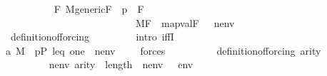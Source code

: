 \begin{isabellebody}
\ \ \ \ \ \ \isamarkupfalse%
\ {\isachardoublequoteopen}\ {\isachardot}{\kern0pt}{\isachardot}{\kern0pt}{\isachardot}{\kern0pt}\ {\isasymlongleftrightarrow}\ {\isacharparenleft}{\kern0pt}{\isasymforall}F{\isachardot}{\kern0pt}\ M{\isacharunderscore}{\kern0pt}generic{\isacharparenleft}{\kern0pt}F{\isacharparenright}{\kern0pt}\ {\isasymand}\ p\ {\isasymin}\ F\ {\isasymlongrightarrow}\ \isanewline
\ \ \ \ \ \ \ \ \ \ \ \ \ \ \ \ \ \ \ \ \ \ \ \ \ \ \ M{\isacharbrackleft}{\kern0pt}F{\isacharbrackright}{\kern0pt}{\isacharcomma}{\kern0pt}\ \ map{\isacharparenleft}{\kern0pt}val{\isacharparenleft}{\kern0pt}F{\isacharparenright}{\kern0pt}{\isacharcomma}{\kern0pt}\ {\isacharbrackleft}{\kern0pt}{\isasymtheta}{\isacharbrackright}{\kern0pt}\ {\isacharat}{\kern0pt}\ nenv\ {\isacharat}{\kern0pt}\ {\isacharbrackleft}{\kern0pt}{\isasympi}{\isacharbrackright}{\kern0pt}{\isacharparenright}{\kern0pt}\ {\isasymTurnstile}\ \ {\isacharquery}{\kern0pt}{\isasymchi}{\isacharparenright}{\kern0pt}{\isachardoublequoteclose}\isanewline
\ \ \ \ \ \ \ \ \isamarkupfalse%
\ \ definition{\isacharunderscore}{\kern0pt}of{\isacharunderscore}{\kern0pt}forcing\ \isanewline
\ \ \ \ \ \ \isamarkupfalse%
\ {\isacharparenleft}{\kern0pt}intro\ iffI{\isacharparenright}{\kern0pt}\isanewline
\ \ \ \ \ \ \ \ \isamarkupfalse%
\ a{}{\isacharcolon}{\kern0pt}\ {\isachardoublequoteopen}M{\isacharcomma}{\kern0pt}\ \ {\isacharbrackleft}{\kern0pt}p{\isacharcomma}{\kern0pt}P{\isacharcomma}{\kern0pt}\ leq{\isacharcomma}{\kern0pt}\ one{\isacharcomma}{\kern0pt}{\isasymtheta}{\isacharbrackright}{\kern0pt}\ {\isacharat}{\kern0pt}\ nenv\ {\isacharat}{\kern0pt}\ {\isacharbrackleft}{\kern0pt}{\isasympi}{\isacharbrackright}{\kern0pt}\ {\isasymTurnstile}\ \ forces{\isacharparenleft}{\kern0pt}{\isacharquery}{\kern0pt}{\isasymchi}{\isacharparenright}{\kern0pt}{\isachardoublequoteclose}\isanewline
\ \ \ \ \ \ \ \ \isamarkupfalse%
\ definition{\isacharunderscore}{\kern0pt}of{\isacharunderscore}{\kern0pt}forcing\ {\isacartoucheopen}arity{\isacharparenleft}{\kern0pt}{\isasymphi}{\isacharparenright}{\kern0pt}{\isasymle}\ {}{\isacharhash}{\kern0pt}{\isacharplus}{\kern0pt}{\isacharunderscore}{\kern0pt}{\isacartoucheclose}\isanewline
\ \ \ \ \ \ \ \ \isamarkupfalse%
\ {\isacartoucheopen}nenv{\isasymin}{\isacharunderscore}{\kern0pt}{\isacartoucheclose}\ {\isacartoucheopen}arity{\isacharparenleft}{\kern0pt}{\isacharquery}{\kern0pt}{\isasymchi}{\isacharparenright}{\kern0pt}\ {\isasymle}\ length{\isacharparenleft}{\kern0pt}{\isacharbrackleft}{\kern0pt}{\isasymtheta}{\isacharbrackright}{\kern0pt}\ {\isacharat}{\kern0pt}\ nenv\ {\isacharat}{\kern0pt}\ {\isacharbrackleft}{\kern0pt}{\isasympi}{\isacharbrackright}{\kern0pt}{\isacharparenright}{\kern0pt}{\isacartoucheclose}\ {\isacartoucheopen}env{\isasymin}{\isacharunderscore}{\kern0pt}{\isacartoucheclose}\isanewline

\end{isabellebody}
